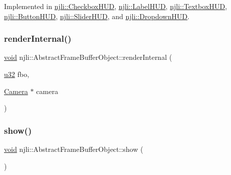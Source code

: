 Implemented in \mbox{\hyperlink{classnjli_1_1_checkbox_h_u_d_a9a833ae0ac0412333e305dad18a46c6b}{njli\+::\+Checkbox\+H\+UD}}, \mbox{\hyperlink{classnjli_1_1_label_h_u_d_a40fae179595de9d7d29bdd7bc9fbbcf7}{njli\+::\+Label\+H\+UD}}, \mbox{\hyperlink{classnjli_1_1_textbox_h_u_d_a6daa89a33de35e6cf85b56970447a3a8}{njli\+::\+Textbox\+H\+UD}}, \mbox{\hyperlink{classnjli_1_1_button_h_u_d_add44501f95991324e5733c8bfc18f166}{njli\+::\+Button\+H\+UD}}, \mbox{\hyperlink{classnjli_1_1_slider_h_u_d_abb2dd1860a2ae905408275a8bdad484c}{njli\+::\+Slider\+H\+UD}}, and \mbox{\hyperlink{classnjli_1_1_dropdown_h_u_d_a69bfd903a2b1d0881f9269679621e050}{njli\+::\+Dropdown\+H\+UD}}.

\mbox{\label{classnjli_1_1_abstract_frame_buffer_object_ae5861927463cc57cdd8214a4b957a68d}} 
\subsubsection{\texorpdfstring{render\+Internal()}{renderInternal()}}
{\footnotesize\ttfamily \mbox{\hyperlink{_thread_8h_af1e856da2e658414cb2456cb6f7ebc66}{void}} njli\+::\+Abstract\+Frame\+Buffer\+Object\+::render\+Internal (\begin{DoxyParamCaption}\item[{\mbox{\hyperlink{_util_8h_a10e94b422ef0c20dcdec20d31a1f5049}{u32}}}]{fbo,  }\item[{\mbox{\hyperlink{classnjli_1_1_camera}{Camera}} $\ast$}]{camera }\end{DoxyParamCaption})\hspace{0.3cm}{\ttfamily [private]}}

\mbox{\label{classnjli_1_1_abstract_frame_buffer_object_a73ffd499fceaacd59b518a541ed2133e}} 
\subsubsection{\texorpdfstring{show()}{show()}}
{\footnotesize\ttfamily \mbox{\hyperlink{_thread_8h_af1e856da2e658414cb2456cb6f7ebc66}{void}} njli\+::\+Abstract\+Frame\+Buffer\+Object\+::show (\begin{DoxyParamCaption}{ }\end{DoxyParamCaption})}


